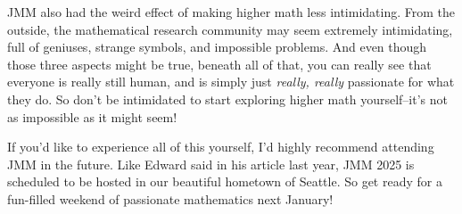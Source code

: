 \documentclass{article}
\begin{document}
JMM also had the weird effect of making higher math less intimidating. From the outside, the mathematical research community may seem extremely intimidating, full of geniuses, strange symbols, and impossible problems. And even though those three aspects might be true, beneath all of that, you can really see that everyone is really still human, and is simply just \textit{really, really} passionate for what they do. So don't be intimidated to start exploring higher math yourself--it's not as impossible as it might seem!

If you'd like to experience all of this yourself, I'd highly recommend attending JMM in the future. Like Edward said in his article last year, JMM 2025 is scheduled to be hosted in our beautiful hometown of Seattle. So get ready for a fun-filled weekend of passionate mathematics next January!
\end{document}
